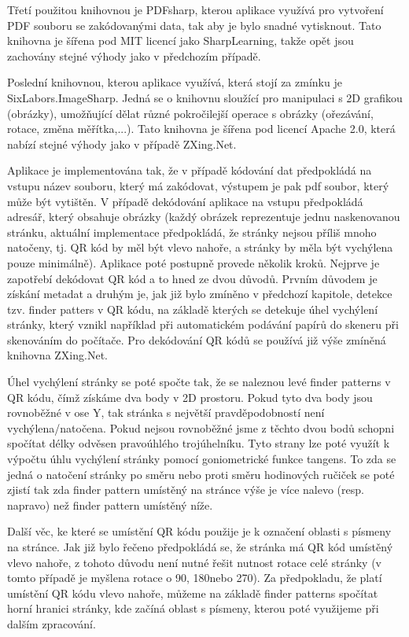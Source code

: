 \documentclass[conference]{IEEEtran}
\begin{document}
Třetí použitou knihovnou je PDFsharp, kterou aplikace využívá pro vytvoření PDF souboru se zakódovanými data, tak aby je bylo snadné vytisknout. Tato knihovna je šířena pod MIT licencí jako SharpLearning, takže opět jsou zachovány stejné výhody jako v předchozím případě.

Poslední knihovnou, kterou aplikace využívá, která stojí za zmínku je SixLabors.ImageSharp. Jedná se o knihovnu sloužící pro manipulaci s 2D grafikou (obrázky), umožňující dělat různé pokročilejší operace s obrázky (ořezávání, rotace, změna měřítka,...). Tato knihovna je šířena pod licencí Apache 2.0, která nabízí stejné výhody jako v případě ZXing.Net.

Aplikace je implementována tak, že v případě kódování dat předpokládá na vstupu název souboru, který má zakódovat, výstupem je pak pdf soubor, který může být vytištěn. V případě dekódování aplikace na vstupu předpokládá adresář, který obsahuje obrázky (každý obrázek reprezentuje jednu naskenovanou stránku, aktuální implementace předpokládá, že stránky nejsou příliš mnoho natočeny, tj. QR kód by měl být vlevo nahoře, a stránky by měla být vychýlena pouze minimálně). Aplikace poté postupně provede několik kroků. Nejprve je zapotřebí dekódovat QR kód a to hned ze dvou důvodů. Prvním důvodem je získání metadat a druhým je, jak již bylo zmíněno v předchozí kapitole, detekce tzv. finder patters v QR kódu, na základě kterých se detekuje úhel vychýlení stránky, který vznikl například při automatickém podávání papírů do skeneru při skenováním do počítače. Pro dekódování QR kódů se používá již výše zmíněná knihovna ZXing.Net. 

Úhel vychýlení stránky se poté spočte tak, že se naleznou levé finder patterns v QR kódu, čímž získáme dva body v 2D prostoru. Pokud tyto dva body jsou rovnoběžné v ose Y, tak stránka s největší pravděpodobností není vychýlena/natočena. Pokud nejsou rovnoběžné jsme z těchto dvou bodů schopni spočítat délky odvěsen pravoúhlého trojúhelníku. Tyto strany lze poté využít k výpočtu úhlu vychýlení stránky pomocí goniometrické funkce tangens. To zda se jedná o natočení stránky po směru nebo proti směru hodinových ručiček se poté zjistí tak zda finder pattern umístěný na stránce výše je více nalevo (resp. napravo) než finder pattern umístěný níže.

Další věc, ke které se umístění QR kódu použije je k označení oblasti s písmeny na stránce. Jak již bylo řečeno předpokládá se, že stránka má QR kód umístěný vlevo nahoře, z tohoto důvodu není nutné řešit nutnost rotace celé stránky (v tomto případě je myšlena rotace o 90\degree, 180\degree nebo 270\degree). Za předpokladu, že platí umístění QR kódu vlevo nahoře, můžeme na základě finder patterns spočítat horní hranici stránky, kde začíná oblast s písmeny, kterou poté využijeme při dalším zpracování.
\end{document}
